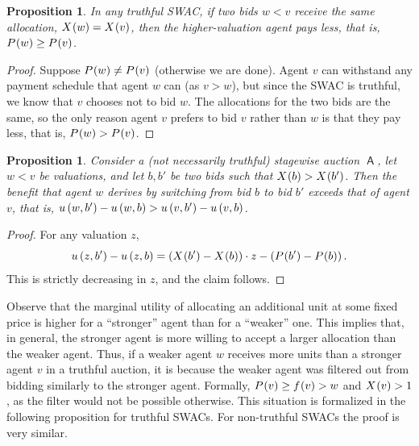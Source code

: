 \documentclass[11pt,letterpaper]{article}
\newcommand{\swac}{SWAC\xspace}
\newcommand{\swacs}{SWACs\xspace}
\DeclareMathOperator{\A}{\auc{A}}
\theoremstyle{plain}
\newtheorem{proposition}[theorem]{Proposition}
\newcommand{\auc}[1]{\mathsf{#1}}
\begin{document}
\begin{proposition}
    \label{prop:decreasing-payments}
    In any truthful \swac,
    if two bids $w < v$
    receive the same allocation, $\x{w} = \x{v}$,
    then 
    the higher-valuation agent pays less,
    that is,
    $\p{w} \geq \p{v}$.
\end{proposition}
\begin{proof}
    Suppose $\p{w} \neq \p{v}$ (otherwise we are done).
    Agent $v$ can withstand any payment schedule that agent $w$ can (as $v > w$),
    but since the \swac is truthful,
    we know that $v$ chooses not to bid $w$.
    The allocations for the two bids are the same, so the only reason agent $v$ prefers to bid $v$ rather than $w$ is that
    they pay less,
    that is,
    $\p{w} > \p{v}$.
\end{proof}

\begin{proposition}
    \label{prop:benefit_swap}
Consider a (not necessarily truthful) stagewise auction $\A$,
let $w < v$ be valuations,
    and let $b, b'$ be two bids such that $\x{b} > \x{b'}$.
    Then the benefit that agent $w$
    derives by switching 
    from bid $b$ to bid $b'$
    exceeds that of agent $v$,
    that is,
        $\util{w}{b'} - \util{w}{b}
        >
        \util{v}{b'} - \util{v}{b}
        $.
    \end{proposition}
\begin{proof}
    For any valuation $z$,
    \begin{equation*}
        \util{z}{b'} - \util{z}{b}
        =
        \left( \x{b'} - \x{b} \right) \cdot z - \left( \p{b'} - \p{b} \right).
    \end{equation*}
This is strictly 
decreasing
in $z$, and the claim follows.
\end{proof}

Observe that the marginal utility of allocating an additional unit at some fixed price is higher for a ``stronger'' agent than for a ``weaker'' one. This implies that, in general, the stronger agent is more willing to accept a larger allocation than the weaker agent. Thus, if a weaker agent $w$ receives more units than a stronger agent $v$ in a truthful auction, it is because the weaker agent was filtered out from bidding similarly to the stronger agent. Formally, $\p{v} \geq \f{v} > w$ and $\x{v}>1$, as the filter would not be possible otherwise. This situation is formalized in the following proposition for truthful \swacs. For non-truthful \swacs the proof is very similar.
\end{document}
